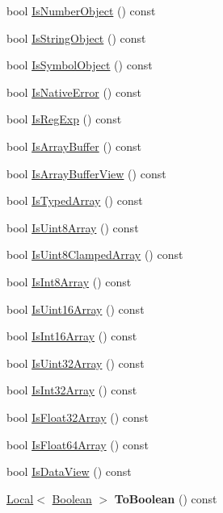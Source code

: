 \begin{DoxyCompactItemize}
bool \hyperlink{classv8_1_1_value_a5f4aa9504a6d8fc3af9489330179fe14}{Is\+Number\+Object} () const 
\item 
bool \hyperlink{classv8_1_1_value_a3e0f2727455fd01a39a60b92f77e28e0}{Is\+String\+Object} () const 
\item 
bool \hyperlink{classv8_1_1_value_a867baa94cb8f1069452359e6cef6751e}{Is\+Symbol\+Object} () const 
\item 
bool \hyperlink{classv8_1_1_value_a579fb52e893cdc24f8b77e5acc77d06d}{Is\+Native\+Error} () const 
\item 
bool \hyperlink{classv8_1_1_value_aae41e43486937d6122c297a0d43ac0b8}{Is\+Reg\+Exp} () const 
\item 
bool \hyperlink{classv8_1_1_value_a65f9dad740f2468b44dc16349611c351}{Is\+Array\+Buffer} () const 
\item 
bool \hyperlink{classv8_1_1_value_ad54475d15b7e6b6e17fc80fb4570cdf2}{Is\+Array\+Buffer\+View} () const 
\item 
bool \hyperlink{classv8_1_1_value_ac2f2f6c39f14a39fbb5b43577125dfe4}{Is\+Typed\+Array} () const 
\item 
bool \hyperlink{classv8_1_1_value_acbe2cd9c9cce96ee498677ba37c8466d}{Is\+Uint8\+Array} () const 
\item 
bool \hyperlink{classv8_1_1_value_ad3cb464ab5ef0215bd2cbdd4eb2b7e3d}{Is\+Uint8\+Clamped\+Array} () const 
\item 
bool \hyperlink{classv8_1_1_value_a10a88a2794271dfcd9c3abd565e8f28a}{Is\+Int8\+Array} () const 
\item 
bool \hyperlink{classv8_1_1_value_a4a45fabf58b241f5de3086a3dd0a09ae}{Is\+Uint16\+Array} () const 
\item 
bool \hyperlink{classv8_1_1_value_a928c586639dd75ae4efdaa66b1fc4d50}{Is\+Int16\+Array} () const 
\item 
bool \hyperlink{classv8_1_1_value_a5e39229dc74d534835cf4ceba10676f4}{Is\+Uint32\+Array} () const 
\item 
bool \hyperlink{classv8_1_1_value_a48eac78a49c8b42d9f8cf05c514b3750}{Is\+Int32\+Array} () const 
\item 
bool \hyperlink{classv8_1_1_value_a4effc7ca1a221dd8c1e23c0f28145ef0}{Is\+Float32\+Array} () const 
\item 
bool \hyperlink{classv8_1_1_value_a293f140b81b0219d1497e937ed948b1e}{Is\+Float64\+Array} () const 
\item 
bool \hyperlink{classv8_1_1_value_afd20ab51e79658acc405c12dad2260ab}{Is\+Data\+View} () const 
\item 
\hypertarget{classv8_1_1_value_a73d653dc4a4999ce7258b40a4d8a1510}{}\hyperlink{classv8_1_1_local}{Local}$<$ \hyperlink{classv8_1_1_boolean}{Boolean} $>$ {\bfseries To\+Boolean} () const \label{classv8_1_1_value_a73d653dc4a4999ce7258b40a4d8a1510}


\end{DoxyCompactItemize}
